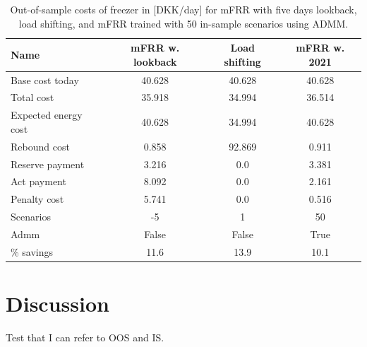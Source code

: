 \documentclass[11pt,a4paper]{article}
\begin{document}
\begin{table}[H]
    \caption{Out-of-sample costs of freezer in [DKK/day] for mFRR with five days lookback, load shifting, and mFRR trained with 50 in-sample scenarios using ADMM.}
    \label{tab:cases_compared}
    \centering
    \begin{tabular}{lccc}
        \toprule
        Name                 & mFRR w. lookback & Load shifting & mFRR w. 2021 \\
        \midrule
        Base cost today      & 40.628           & 40.628        & 40.628       \\
        Total cost           & 35.918           & 34.994        & 36.514       \\
        Expected energy cost & 40.628           & 34.994        & 40.628       \\
        Rebound cost         & 0.858            & 92.869        & 0.911        \\
        Reserve payment      & 3.216            & 0.0           & 3.381        \\
        Act payment          & 8.092            & 0.0           & 2.161        \\
        Penalty cost         & 5.741            & 0.0           & 0.516        \\
        Scenarios            & -5               & 1             & 50           \\
        Admm                 & False            & False         & True         \\
        \% savings           & 11.6             & 13.9          & 10.1         \\
        \bottomrule
    \end{tabular}
\end{table}

\section{Discussion}




Test that I can refer to \gls{OOS} and \gls{IS}.







%
\printbibliography
\end{document}
